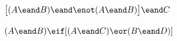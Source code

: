 \begin{earg}
\item $\bigl[(A\eand B) \eand\enot(A\eand B)\bigr] \eand C$ \vspace{.5ex}	
%
%
%
%
%
\item $(A \eand B) \eif[(A \eand C) \eor (B \eand D)]$ \vspace{.5ex}		
%
%
%
\end{earg}

